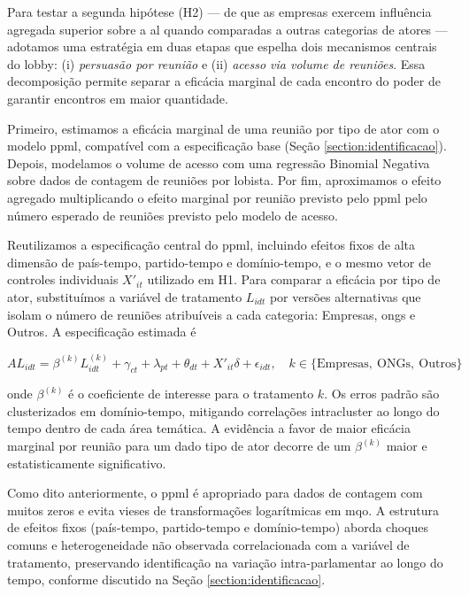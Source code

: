 
Para testar a segunda hipótese (H2) — de que as empresas exercem influência agregada superior sobre a \acrshort{al} quando comparadas a outras categorias de atores — adotamos uma estratégia em duas etapas que espelha dois mecanismos centrais do lobby: (i) \textit{persuasão por reunião} e (ii) \textit{acesso via volume de reuniões}. Essa decomposição permite separar a eficácia marginal de cada encontro do poder de garantir encontros em maior quantidade.

Primeiro, estimamos a eficácia marginal de uma reunião por tipo de ator com o modelo \acrshort{ppml}, compatível com a especificação base (Seção \ref{section:identificacao}). Depois, modelamos o volume de acesso com uma regressão Binomial Negativa sobre dados de contagem de reuniões por lobista. Por fim, aproximamos o efeito agregado multiplicando o efeito marginal por reunião previsto pelo \acrshort{ppml} pelo número esperado de reuniões previsto pelo modelo de acesso.

Reutilizamos a especificação central do \acrshort{ppml}, incluindo efeitos fixos de alta dimensão de país-tempo, partido-tempo e domínio-tempo, e o mesmo vetor de controles individuais $X'_{it}$ utilizado em H1. Para comparar a eficácia por tipo de ator, substituímos a variável de tratamento $L_{idt}$ por versões alternativas que isolam o número de reuniões atribuíveis a cada categoria: Empresas, \acrshort{ong}s e Outros. A especificação estimada é

\begin{equation}
    AL_{idt} = \beta^{(k)} L_{idt}^{(k)} + \gamma_{ct} + \lambda_{pt} + \theta_{dt} + X'_{it}\delta + \epsilon_{idt}, \quad k \in \{\text{Empresas},\ \text{ONGs},\ \text{Outros}\}
\end{equation}

onde $\beta^{(k)}$ é o coeficiente de interesse para o tratamento $k$. Os erros padrão são clusterizados em domínio-tempo, mitigando correlações intracluster ao longo do tempo dentro de cada área temática. A evidência a favor de maior eficácia marginal por reunião para um dado tipo de ator decorre de um $\beta^{(k)}$ maior e estatisticamente significativo.

Como dito anteriormente, o \acrshort{ppml} é apropriado para dados de contagem com muitos zeros e evita vieses de transformações logarítmicas em \acrshort{mqo}. A estrutura de efeitos fixos (país-tempo, partido-tempo e domínio-tempo) aborda choques comuns e heterogeneidade não observada correlacionada com a variável de tratamento, preservando identificação na variação intra-parlamentar ao longo do tempo, conforme discutido na Seção \ref{section:identificacao}.

